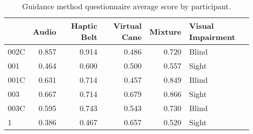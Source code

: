 
\begin{table}[!htb]
\centering
\caption{Guidance method questionnaire average score by participant.}
\label{tab:questionnaire_average}
\begin{tabular}{lrrrrl}
\toprule
{} &  Audio &  Haptic Belt &  Virtual Cane &  Mixture & Visual Impairment \\
\midrule
002C &  0.857 &        0.914 &         0.486 &    0.720 &             Blind \\
001  &  0.464 &        0.600 &         0.500 &    0.557 &             Sight \\
001C &  0.631 &        0.714 &         0.457 &    0.849 &             Blind \\
003  &  0.667 &        0.714 &         0.679 &    0.866 &             Sight \\
003C &  0.595 &        0.743 &         0.543 &    0.730 &             Blind \\
1    &  0.386 &        0.467 &         0.657 &    0.520 &             Sight \\
\bottomrule
\end{tabular}
\end{table}

